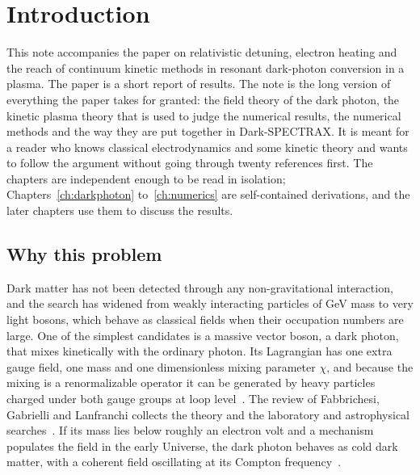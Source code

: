 \chapter{Introduction}\label{ch:intro}

This note accompanies the paper on relativistic detuning, electron heating and the reach of continuum kinetic methods in resonant dark-photon conversion in a plasma. The paper is a short report of results. The note is the long version of everything the paper takes for granted: the field theory of the dark photon, the kinetic plasma theory that is used to judge the numerical results, the numerical methods and the way they are put together in Dark-SPECTRAX. It is meant for a reader who knows classical electrodynamics and some kinetic theory and wants to follow the argument without going through twenty references first. The chapters are independent enough to be read in isolation; Chapters~\ref{ch:darkphoton} to~\ref{ch:numerics} are self-contained derivations, and the later chapters use them to discuss the results.

\section{Why this problem}

Dark matter has not been detected through any non-gravitational interaction, and the search has widened from weakly interacting particles of GeV mass to very light bosons, which behave as classical fields when their occupation numbers are large. One of the simplest candidates is a massive vector boson, a dark photon, that mixes kinetically with the ordinary photon. Its Lagrangian has one extra gauge field, one mass and one dimensionless mixing parameter $\chi$, and because the mixing is a renormalizable operator it can be generated by heavy particles charged under both gauge groups at loop level~\citep{Holdom1986}. The review of Fabbrichesi, Gabrielli and Lanfranchi collects the theory and the laboratory and astrophysical searches~\citep{Fabbrichesi2020}. If its mass lies below roughly an electron volt and a mechanism populates the field in the early Universe, the dark photon behaves as cold dark matter, with a coherent field oscillating at its Compton frequency~\citep{NelsonScholtz2011,Arias2012}.

